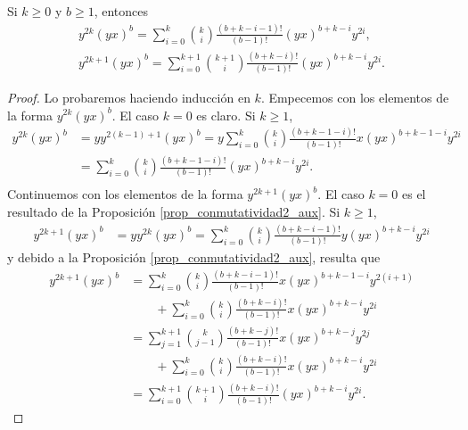 \documentclass[a4paper,oneside,fleqn,11pt,../tesis.tex]{subfiles}
\begin{document}
\begin{prop}
\label{prop_conmutatividad2}
Si $k \geq 0$ y $b \geq 1$, entonces
\begin{align*}
    y^{2k}(yx)^b = \sum_{i = 0}^{k}\binom{k}{i} \frac{(b + k - i - 1)!}{(b - 1)!} (yx)^{b + k - i}y^{2i},\\
    y^{2k + 1}(yx)^{b} = \sum_{i = 0}^{k + 1}\binom{k + 1}{i}\frac{(b + k - i)!}{(b - 1)!}(yx)^{b + k - i}y^{2i}.
\end{align*}
\end{prop}
\begin{proof}
    Lo probaremos haciendo inducción en $k$. Empecemos con los elementos de la forma $y^{2k}(yx)^b$. El caso $k = 0$
    es claro. Si $k \geq 1$,
    \begin{align*}
        y^{2k}(yx)^{b} &= y y^{2(k - 1) + 1}(yx)^b = y \sum_{i = 0}^{k}\binom{k}{i}\frac{(b + k  -1 - i)!}{(b - 1)!}x(yx)^{b + k - 1 - i}y^{2i}\\
        &= \sum_{i = 0}^{k}\binom{k}{i}\frac{(b + k  -1 - i)!}{(b - 1)!}(yx)^{b + k - i}y^{2i}.\\
    \end{align*}
    Continuemos con los elementos de la forma $y^{2k + 1}(yx)^{b}$.
    El caso $k = 0$ es el resultado de la Proposición \ref{prop_conmutatividad2_aux}. Si $k \geq 1$,
    \begin{align*}
        y^{2k + 1}(yx)^b &= yy^{2k}(yx)^b =  \sum_{i = 0}^{k}\binom{k}{i} \frac{(b + k - i - 1)!}{(b - 1)!} y (yx)^{b + k - i}y^{2i}
    \end{align*}
    y debido a la Proposición \ref{prop_conmutatividad2_aux}, resulta que
    \begin{align*}
        y^{2k + 1}(yx)^b &= \sum_{i = 0}^{k}\binom{k}{i} \frac{(b + k - i - 1)!}{(b - 1)!} x (yx)^{b + k -1 - i}y^{2(i + 1)}\\
            &\qquad + \sum_{i = 0}^{k}\binom{k}{i} \frac{(b + k - i)!}{(b - 1)!} x (yx)^{b + k - i}y^{2i}\\
        &= \sum_{j = 1}^{k + 1}\binom{k}{j - 1} \frac{(b + k - j)!}{(b - 1)!} x (yx)^{b + k - j}y^{2j}\\
            &\qquad + \sum_{i = 0}^{k}\binom{k}{i} \frac{(b + k - i)!}{(b - 1)!} x (yx)^{b + k - i}y^{2i}\\
        &= \sum_{i = 0}^{k + 1}\binom{k + 1}{i}\frac{(b + k - i)!}{(b - 1)!}(yx)^{b + k - i}y^{2i}.
    \end{align*}     
\end{proof}
\end{document}
